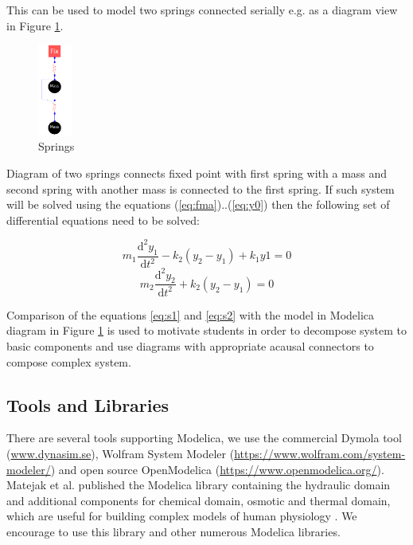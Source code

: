 \documentclass[letterpaper, 10 pt, conference]{ieeeconf}  %
\begin{document}
This can be used to model two springs connected serially e.g. as a diagram view in Figure \ref{fig:twosprings}. 

\begin{figure}
  \begin{center}
    \includegraphics[width=0.1\textwidth]{twosprings.png}
  \end{center}
  \caption{Springs}
  \label{fig:twosprings}
\end{figure}


Diagram of two springs connects fixed point with first spring with a mass and second spring with another mass is connected to the first spring. If such system  will be solved using the equations (\ref{eq:fma})..(\ref{eq:y0}) then the following set of differential equations need to be solved:


\begin{equation}
m_1\frac{\mathrm{d}^2 y_1}{\mathrm{d}t^2}-k_2(y_2-y_1)+k_1y1 = 0
\label{eq:s1}
\end{equation}
\begin{equation}
m_2\frac{\mathrm{d}^2 y_2}{\mathrm{d}t^2}+k_2(y_2-y_1) = 0
\label{eq:s2}
\end{equation}

Comparison of the equations \ref{eq:s1} and \ref{eq:s2} with the model in Modelica diagram in Figure \ref{fig:twosprings} is used to motivate students in order to decompose system to basic components and use diagrams with appropriate acausal connectors to compose complex system. 

\subsection{Tools and Libraries}
There are several tools supporting Modelica, we use the commercial Dymola tool (\url{www.dynasim.se}), Wolfram System Modeler (\url{https://www.wolfram.com/system-modeler/}) and open source OpenModelica (\url{https://www.openmodelica.org/}).
Matejak et al. published the Modelica library containing the hydraulic domain and additional components for chemical domain, osmotic and thermal domain, which are useful for building complex models of human physiology \cite{Matejak2014,Matejak2014mj}. We encourage to use this library and other numerous Modelica libraries. 
\end{document}
